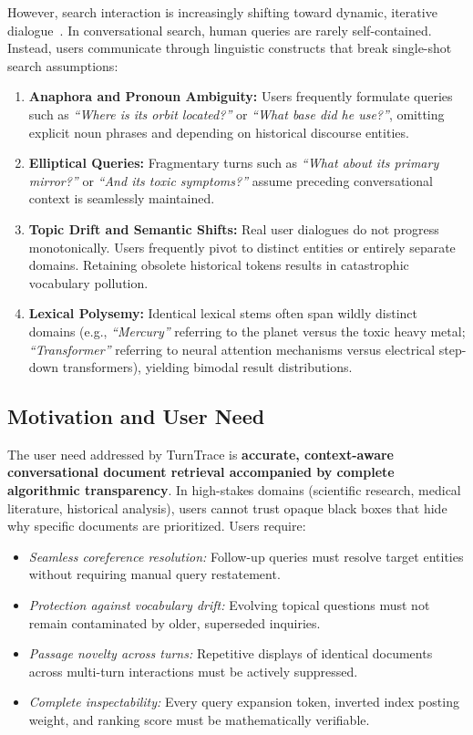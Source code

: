 \documentclass[10pt,a4paper,twocolumn]{article}
\begin{document}
However, search interaction is increasingly shifting toward dynamic, iterative dialogue~\cite{radlinski2017theoretical, anand2020conversational}. In conversational search, human queries are rarely self-contained. Instead, users communicate through linguistic constructs that break single-shot search assumptions:
\begin{enumerate}
    \item \textbf{Anaphora and Pronoun Ambiguity:} Users frequently formulate queries such as \textit{``Where is its orbit located?''} or \textit{``What base did he use?''}, omitting explicit noun phrases and depending on historical discourse entities.
    \item \textbf{Elliptical Queries:} Fragmentary turns such as \textit{``What about its primary mirror?''} or \textit{``And its toxic symptoms?''} assume preceding conversational context is seamlessly maintained.
    \item \textbf{Topic Drift and Semantic Shifts:} Real user dialogues do not progress monotonically. Users frequently pivot to distinct entities or entirely separate domains. Retaining obsolete historical tokens results in catastrophic vocabulary pollution.
    \item \textbf{Lexical Polysemy:} Identical lexical stems often span wildly distinct domains (e.g., \textit{``Mercury''} referring to the planet versus the toxic heavy metal; \textit{``Transformer''} referring to neural attention mechanisms versus electrical step-down transformers), yielding bimodal result distributions.
\end{enumerate}

\subsection{Motivation and User Need}
The user need addressed by TurnTrace is \textbf{accurate, context-aware conversational document retrieval accompanied by complete algorithmic transparency}. In high-stakes domains (scientific research, medical literature, historical analysis), users cannot trust opaque black boxes that hide why specific documents are prioritized. Users require:
\begin{itemize}
    \item \textit{Seamless coreference resolution:} Follow-up queries must resolve target entities without requiring manual query restatement.
    \item \textit{Protection against vocabulary drift:} Evolving topical questions must not remain contaminated by older, superseded inquiries.
    \item \textit{Passage novelty across turns:} Repetitive displays of identical documents across multi-turn interactions must be actively suppressed.
    \item \textit{Complete inspectability:} Every query expansion token, inverted index posting weight, and ranking score must be mathematically verifiable.
\end{itemize}
\end{document}
